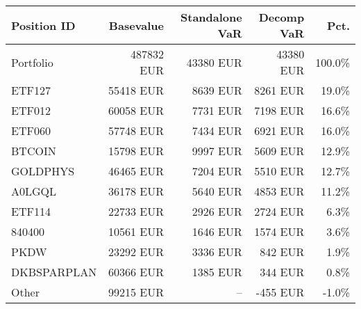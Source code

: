 \center
\begin{tabular}{l|r|r|r|r}
Position ID & Basevalue & Standalone VaR & Decomp VaR & Pct.\\\hline\hline
Portfolio &    487832 EUR &     43380  EUR&     43380 EUR & 100.0\%\\\hline
ETF127 &     55418 EUR &      8639 EUR &      8261 EUR& 19.0\%\\
ETF012 &     60058 EUR &      7731 EUR &      7198 EUR& 16.6\%\\
ETF060 &     57748 EUR &      7434 EUR &      6921 EUR& 16.0\%\\
BTCOIN &     15798 EUR &      9997 EUR &      5609 EUR& 12.9\%\\
GOLDPHYS &     46465 EUR &      7204 EUR &      5510 EUR& 12.7\%\\
A0LGQL &     36178 EUR &      5640 EUR &      4853 EUR& 11.2\%\\
ETF114 &     22733 EUR &      2926 EUR &      2724 EUR& 6.3\%\\
840400 &     10561 EUR &      1646 EUR &      1574 EUR& 3.6\%\\
PKDW &     23292 EUR &      3336 EUR &       842 EUR& 1.9\%\\
DKBSPARPLAN &     60366 EUR &      1385 EUR &       344 EUR& 0.8\%\\
Other &     99215 EUR & -- &      -455 EUR& -1.0\%\\
\end{tabular}
